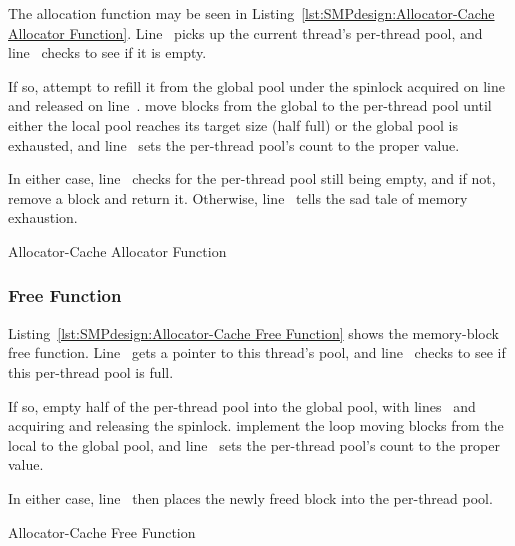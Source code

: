 \begin{fcvref}
The allocation function  may be seen in
Listing~\ref{lst:SMPdesign:Allocator-Cache Allocator Function}.
Line~ picks up the current thread's per-thread pool,
and line~ checks to see if it is empty.

If so,  attempt to refill it
from the global pool
under the spinlock acquired on line~ and released on line~.
 move blocks from the global
to the per-thread pool until
either the local pool reaches its target size (half full) or
the global pool is exhausted, and line~ sets the per-thread pool's
count to the proper value.

In either case, line~ checks for the per-thread
pool still being
empty, and if not,  remove a block and return it.
Otherwise, line~ tells the sad tale of memory exhaustion.
\end{fcvref}

\begin{listing}

\caption{Allocator-Cache Allocator Function}
\label{lst:SMPdesign:Allocator-Cache Allocator Function}
\end{listing}

\subsubsection{Free Function}

\begin{fcvref}
Listing~\ref{lst:SMPdesign:Allocator-Cache Free Function} shows
the memory-block free function.
Line~ gets a pointer to this thread's pool, and
line~ checks to see if this per-thread pool is full.

If so,  empty half of the per-thread pool
into the global pool,
with lines~ and~ acquiring and releasing the spinlock.
 implement the loop moving blocks
from the local to the
global pool, and line~ sets the per-thread pool's count to the proper
value.

In either case, line~ then places the newly freed block into the
per-thread pool.
\end{fcvref}

\begin{listing}

\caption{Allocator-Cache Free Function}
\label{lst:SMPdesign:Allocator-Cache Free Function}
\end{listing}

